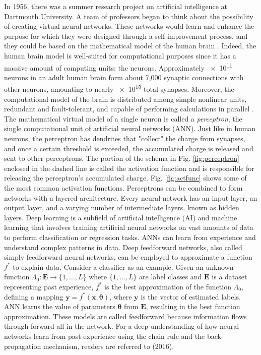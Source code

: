In 1956, there was a summer research project on artificial intelligence at Dartmouth University. A team of professors began to think about the possibility of creating virtual neural networks. These networks would learn and enhance the purpose for which they were designed through a self-improvement process, and they could be based on the mathematical model of the human brain \cite{mccarthy_proposal_1955}. Indeed, the human brain model is well-suited for computational purposes since it has a massive amount of computing units: the neurons. Approximately \num{e11} neurons in an adult human brain form about 7,000 synaptic connections with other neurons, amounting to nearly \num{e15} total synapses. Moreover, the computational model of the brain is distributed among simple nonlinear units, redundant and fault-tolerant, and capable of performing calculations in parallel \cite{matteo_matteucci_perceptrons_2021}. The mathematical virtual model of a single neuron is called a \emph{perceptron}, the single computational unit of artificial neural networks (ANN). Just like in human neurons, the perceptron has dendrites that "collect" the charge from synapses, and once a certain threshold is exceeded, the accumulated charge is released and sent to other perceptrons. The portion of the schema in Fig. \ref{fig:perceptron} enclosed in the dashed line is called the activation function and is responsible for releasing the perceptron's accumulated charge. Fig. \ref{fig:actfunc} shows some of the most common activation functions. Perceptrons can be combined to form networks with a layered architecture. Every neural network has an input layer, an output layer, and a varying number of intermediate layers, known as hidden layers. Deep learning is a subfield of artificial intelligence (AI) and machine learning that involves training artificial neural networks on vast amounts of data to perform classification or regression tasks. ANNs can learn from experience and understand complex patterns in data. Deep feedforward networks, also called simply feedforward neural networks, can be employed to approximate a function $f^*$ to explain data. Consider a classifier as an example. Given an unknown function $\Lambda_0:\mathbf{E} \rightarrow \{1,\dots,L\}$ where $\{1,\dots,L\}$ are label classes and $\mathbf{E}$ is a dataset representing past experience, $f^*$ is the best approximation of the function $\Lambda_0$, defining a mapping $\mathbf{y}=f^*\left(\mathbf{x}, \bm{\theta} \right)$, where $\mathbf{y}$ is the vector of estimated labels. ANN learns the value of parameters $\bm{\theta}$ from $\mathbf{E}$, resulting in the best function approximation. These models are called feedforward because information flows through forward all in the network. For a deep understanding of how neural networks learn from past experience using the chain rule and the back-propagation mechanism, readers are referred to \citeauthor{goodfellow_deep_2016} (2016).
